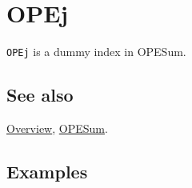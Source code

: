 \documentclass[../FeynCalcManual.tex]{subfiles}
\begin{document}
\hypertarget{opej}{
\section{OPEj}\label{opej}}

\texttt{OPEj} is a dummy index in OPESum.

\subsection{See also}

\hyperlink{toc}{Overview}, \hyperlink{opesum}{OPESum}.

\subsection{Examples}
\end{document}
